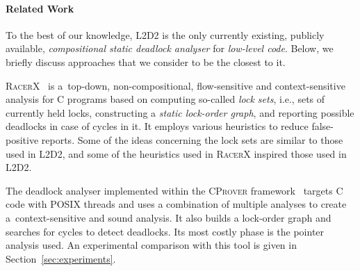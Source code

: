 \documentclass[runningheads]{llncs}
\newcommand{\LLDD}{\textsc{L2D2}\xspace} %
\newcommand{\CProver}{\textsc{CProver}\xspace}
\newcommand{\RacerX}{\textsc{RacerX}\xspace}
\begin{document}
%
%

\enlargethispage{4mm}

\vspace*{-3mm}\paragraph{Related Work} %

To the best of our knowledge, \LLDD is the only currently existing, publicly
available, \emph{compositional static deadlock analyser} for \emph{low-level
code}. Below, we briefly discuss approaches that we consider to be the closest
to it.

\RacerX~\cite{racerX03} is a~top-down, non-compositional, flow-sensitive and
context-sensitive analysis for C programs based on computing so-called
\emph{lock sets}, i.e., sets of currently held locks, constructing
a \emph{static lock-order graph}, and reporting possible deadlocks in case of
cycles in it. It employs various heuristics to reduce false-positive reports.
Some of the ideas concerning the lock sets are similar to those used in \LLDD,
and some of the heuristics used in \RacerX inspired those used in \LLDD.

The deadlock analyser implemented within the \CProver
framework~\cite{kroening16} targets C code with POSIX threads and uses a
combination of multiple analyses to create a~context-sensitive and sound
analysis. It also builds a lock-order graph and searches for cycles to detect
deadlocks. Its most costly phase is the pointer analysis used. An experimental
comparison with this tool is given in Section~\ref{sec:experiments}.
\end{document}
